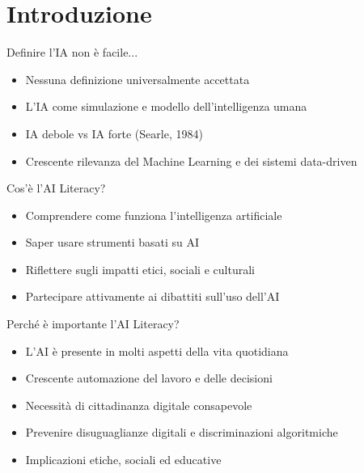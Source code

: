 \documentclass{beamer}
\begin{document}
\section{Introduzione}
%
%
\begin{frame}{Definire l'IA non è facile...}
\begin{itemize}
    \item Nessuna definizione universalmente accettata
    \item L'IA come simulazione e modello dell'intelligenza umana
    \item IA debole vs IA forte (Searle, 1984)
    \item Crescente rilevanza del Machine Learning e dei sistemi data-driven
\end{itemize}
\end{frame}
%
%
\begin{frame}{Cos'è l'AI Literacy?}
  \begin{itemize}
    \item Comprendere come funziona l'intelligenza artificiale
    \item Saper usare strumenti basati su AI
    \item Riflettere sugli impatti etici, sociali e culturali
    \item Partecipare attivamente ai dibattiti sull'uso dell'AI
  \end{itemize}
\end{frame}
%
%
\begin{frame}{Perché è importante l'AI Literacy?}
  \begin{itemize}
    \item L'AI è presente in molti aspetti della vita quotidiana
    \item Crescente automazione del lavoro e delle decisioni
    \item Necessità di cittadinanza digitale consapevole
    \item Prevenire disuguaglianze digitali e discriminazioni algoritmiche
    \item Implicazioni etiche, sociali ed educative
  \end{itemize}
\end{frame}
%
\end{document}
